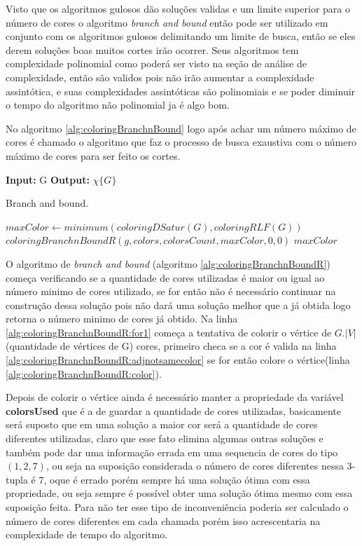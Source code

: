 \documentclass[12pt]{article}
\begin{document}
Visto que os algoritmos gulosos dão soluções validas e um limite superior para o número de cores o algoritmo \emph{branch and bound} então pode ser utilizado em conjunto com os algoritmos gulosos delimitando um limite de busca, então se eles derem soluções boas muitos cortes irão ocorrer. Seus algoritmos tem complexidade polinomial como poderá ser visto na seção de análise de complexidade, então são validos pois não irão aumentar a complexidade assintótica, e suas complexidades assintóticas são polinomiais e se poder diminuir o tempo do algoritmo não polinomial ja é algo bom.

No algoritmo \ref{alg:coloringBranchnBound} logo após achar um número máximo de cores é chamado o algoritmo que faz o processo de busca exaustiva com o número máximo de cores para ser feito os cortes.

\begin{algorithm}
\textbf{Input:} G
\textbf{Output:} $\chi \{G \}$
\caption{Branch and bound.}\label{alg:coloringBranchnBound}
\begin{algorithmic}[1]
\State $maxColor \gets minimum(coloringDSatur(G),coloringRLF(G))$
\State $coloringBranchnBoundR(g,colors,colorsCount,maxColor,0,0)$
\State \Return $maxColor$
\EndProcedure
\end{algorithmic}
\end{algorithm}

O algoritmo de \emph{branch and bound} (algoritmo \ref{alg:coloringBranchnBoundR}) começa verificando se a quantidade de cores utilizadas é maior ou igual ao número minimo de cores utilizado, se for então não é necessário continuar na construção dessa solução pois não dará uma solução melhor que a já obtida logo retorna o número minimo de cores já obtido. Na linha \ref{alg:coloringBranchnBoundR:for1} começa a tentativa de colorir o vértice de \(G.|V|\)(quantidade de vértices de G) cores, primeiro checa se a cor é valida na linha \ref{alg:coloringBranchnBoundR:adjnotsamecolor} se for então colore o vértice(linha \ref{alg:coloringBranchnBoundR:color}).

Depois de colorir o vértice ainda é necessário manter a propriedade da variável \textbf{colorsUsed} que é a de guardar a quantidade de cores utilizadas, basicamente será suposto que em uma solução a maior cor será a quantidade de cores diferentes utilizadas, claro que esse fato elimina algumas outras soluções e também pode dar uma informação errada em uma sequencia de cores do tipo \((1,2,7)\), ou seja na suposição considerada o número de cores diferentes nessa 3-tupla é 7, oque é errado porém sempre há uma solução ótima com essa propriedade, ou seja sempre é possível obter uma solução ótima mesmo com essa suposição feita. Para não ter esse tipo de inconveniência poderia ser calculado o número de cores diferentes em cada chamada porém isso acrescentaria na complexidade de tempo do algoritmo.
\end{document}

